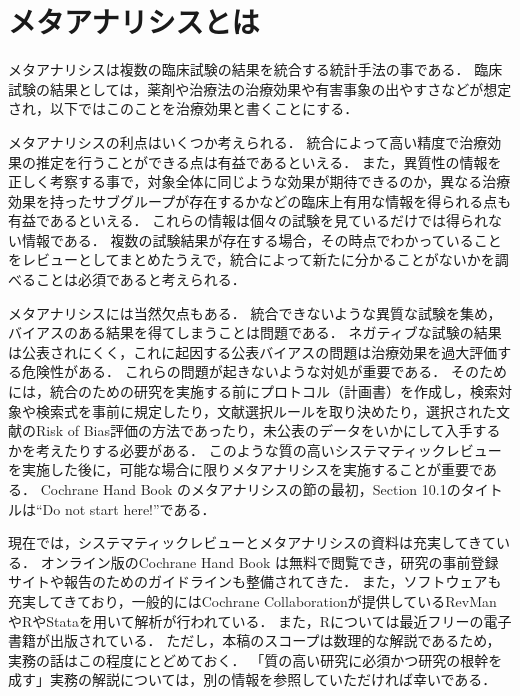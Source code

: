 
\section{メタアナリシスとは}
\label{sec:2}
メタアナリシスは複数の臨床試験の結果を統合する統計手法の事である．
臨床試験の結果としては，薬剤や治療法の治療効果や有害事象の出やすさなどが想定され，以下ではこのことを治療効果と書くことにする．

メタアナリシスの利点はいくつか考えられる．
統合によって高い精度で治療効果の推定を行うことができる点は有益であるといえる．
また，異質性の情報を正しく考察する事で，対象全体に同じような効果が期待できるのか，異なる治療効果を持ったサブグループが存在するかなどの臨床上有用な情報を得られる点も有益であるといえる．
これらの情報は個々の試験を見ているだけでは得られない情報である．
複数の試験結果が存在する場合，その時点でわかっていることをレビューとしてまとめたうえで，統合によって新たに分かることがないかを調べることは必須であると考えられる．

メタアナリシスには当然欠点もある．
統合できないような異質な試験を集め，バイアスのある結果を得てしまうことは問題である．
ネガティブな試験の結果は公表されにくく，これに起因する公表バイアスの問題は治療効果を過大評価する危険性がある．
これらの問題が起きないような対処が重要である．
そのためには，統合のための研究を実施する前にプロトコル（計画書）を作成し，検索対象や検索式を事前に規定したり，文献選択ルールを取り決めたり，選択された文献のRisk of Bias評価の方法であったり，未公表のデータをいかにして入手するかを考えたりする必要がある．
このような質の高いシステマティックレビューを実施した後に，可能な場合に限りメタアナリシスを実施することが重要である．
Cochrane Hand Book \citep{Higgins2019}のメタアナリシスの節の最初，Section 10.1のタイトルは``Do not start here!''である．

現在では，システマティックレビューとメタアナリシスの資料は充実してきている．
オンライン版のCochrane Hand Book \citep{Higgins2019}は無料で閲覧でき，研究の事前登録サイト\citep{PRISMA}や報告のためのガイドライン\citep{PROSPERO}も整備されてきた．
また，ソフトウェアも充実してきており，一般的にはCochrane Collaborationが提供しているRevMan \citep{RevMan}やRやStataを用いて解析が行われている．
また，Rについては最近フリーの電子書籍が出版されている\citep{Harrer2019}．
ただし，本稿のスコープは数理的な解説であるため，実務の話はこの程度にとどめておく．
「質の高い研究に必須かつ研究の根幹を成す」実務の解説については，別の情報を参照していただければ幸いである．
